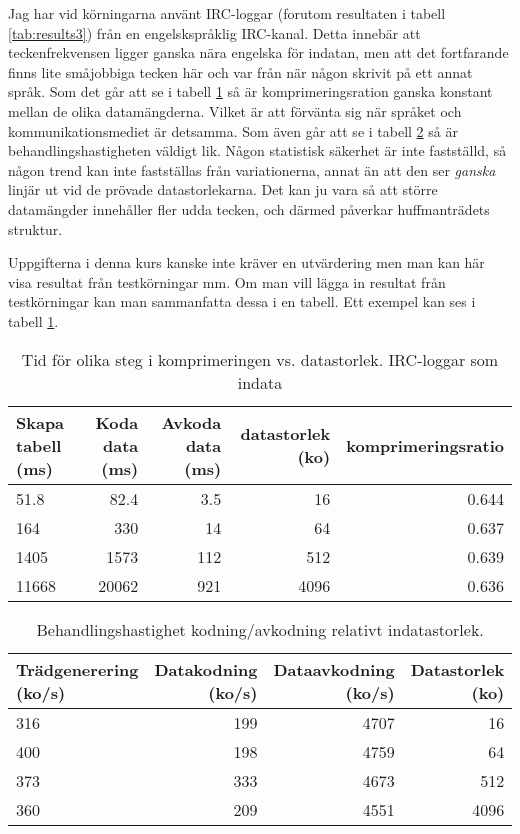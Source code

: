 \documentclass[a4paper, 11pt]{article}
\begin{document}
Jag har vid körningarna använt IRC-loggar (forutom resultaten i tabell \ref{tab:results3}) från en engelskspråklig IRC-kanal. Detta innebär att teckenfrekvensen ligger ganska nära engelska för indatan, men att det fortfarande finns lite småjobbiga tecken här och var från när någon skrivit på ett annat språk. Som det går att se i tabell \ref{tab:results} så är komprimeringsration ganska konstant mellan de olika datamängderna. Vilket är att förvänta sig när språket och kommunikationsmediet är detsamma. Som även går att se i tabell \ref{tab:results2} så är behandlingshastigheten väldigt lik. Någon statistisk säkerhet är inte fastställd, så någon trend kan inte fastställas från variationerna, annat än att den ser \emph{ganska} linjär ut vid de prövade datastorlekarna. Det kan ju vara så att större datamängder innehåller fler udda tecken, och därmed påverkar huffmanträdets struktur.

Uppgifterna i denna kurs kanske inte kräver en utvärdering men man kan
här visa resultat från testkörningar mm. Om man vill lägga in resultat
från testkörningar kan man sammanfatta dessa i en tabell. Ett exempel
kan ses i tabell \ref{tab:results}. 


\begin{table}
\centering
\begin{tabular}{|l|r|r|r|r|}  
\hline
Skapa tabell (ms) & Koda data (ms) & Avkoda data (ms) & datastorlek (ko) & komprimeringsratio\\
\hline
51.8 & 82.4 & 3.5 & 16 & 0.644\\
\hline
164 & 330 & 14 & 64 & 0.637\\
\hline
1405 & 1573 & 112 & 512 & 0.639\\
\hline
11668 & 20062 & 921 & 4096 & 0.636\\
\hline
\end{tabular}
\caption{Tid för olika steg i komprimeringen vs. datastorlek. IRC-loggar som indata}
\label{tab:results}
\end{table}

\begin{table}
\centering
\begin{tabular}{|l|r|r|r|}  
\hline
Trädgenerering (ko/s) & Datakodning (ko/s) & Dataavkodning (ko/s) & Datastorlek (ko)\\
\hline
316 & 199 & 4707 & 16\\
\hline
400 & 198 & 4759 & 64\\
\hline
373 & 333 & 4673 & 512\\
\hline
360 & 209 & 4551 & 4096\\
\hline
\end{tabular}
\caption{Behandlingshastighet kodning/avkodning relativt indatastorlek.}
\label{tab:results2}
\end{table}
\end{document}
